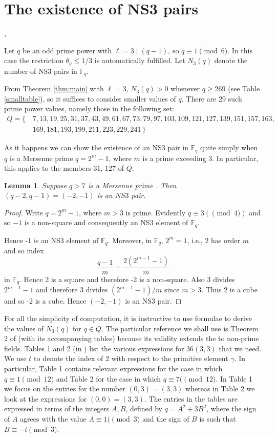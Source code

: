 \documentclass[12pt]{amsart}
\newtheorem{lemma}[thm]{Lemma}
\numberwithin{equation}{section}
\newcommand{\F}{\mathbb{F}_q}
\begin{document}
   
   
 
  \section{The existence of NS3 pairs} 
, 

Let $q$ be an odd prime power with $\ell=3\mid(q-1)$, so $q \equiv 1 \pmod{6}$.  In this case
the restriction $\theta_q\le1/3$ is automatically fulfilled.  Let $N_3(q)$ denote the
number of NS3 pairs in $\F$. 

From Theorem \ref{thm:main} with $\ell=3$,  $N_3(q) >0$ whenever $q\ge 269$ (see Table \ref{smalltable}), so it suffices to consider smaller values of $q$.
There are 29 such prime power values, namely those in the following set:
\begin{align*}
Q=\{\, & 7, 13, 19, 25,  31, 37,43,49, 61, 67,73, 79, 97, 103,  109, 121, 127, 139, 151, 157, 163,\\ & 169,181,  193,199, 211, 223,  229, 241 \,\}\,
\end{align*} 
 
 As it happens we can  show the existence of an NS3 pair in $\F$ quite simply   when $q$ is a Mersenne prime $q=2^m-1$, where $m$ is a prime exceeding 3.
 In particular,  this applies to the members 31, 127 of $Q$. 
\begin{lemma} \label{mers}
Suppose $q>7$ is a Mersenne prime .  Then $(q-2,q-1)=(-2,-1)$ is an $NS3$ pair.
\end{lemma} 
\begin{proof}
Write $q=2^m-1$, where $m >3$ is prime.  Evidently $q \equiv 3 (\pmod {4})$  and so $-1$ is a non-square and consequently an NS3  element of $\F$. 

Hence -1 is an NS3 element of $\F$. Moreover, in $\F$, $2^m=1$, i.e., 2 has order $m$ and so index
\[
 \frac{q-1}{m}= \frac{2(2^{m-1}-1)}{m}
\]
 in $\F$.   Hence 2 is a square and therefore -2 is a non-square.     Also 3 divides $2^{m-1}-1$ and therefore 3 divides $(2^{m-1}-1)/m$ since $m>3$.
 Thus 2  is a cube and so -2 is a cube.  Hence $(-2,-1)$ is an NS3 pair.
\end{proof}
\bigskip
For all the simplicity of computation, it is instructive to use formulae to derive the values of $N_3(q)$ for $q \in Q$.  The particular reference we shall use is Theorem 2 of \cite{AK1995} (with its accompanying tables)  because its validity  extends the to non-prime fields. Tables  1 and 2 (in \cite{AK1995}) list the various expressions for $36(3,3)$ that we need.  We use $t$ to denote the index of  $2$ with respect to the primitive element $\gamma$.   In particular,  Table 1 contains relevant expressions for the case in which $q \equiv 1 \pmod {12}$ and Table 2 for the case in which   $q \equiv 7 (\pmod{12}$.  In Table 1 we focus on the entries for the number $(0,3) =(3,3)$ whereas in Table 2 we look at the expressions for $(0,0)=(3,3)$.  The entries in the tables are expressed in terms of the integers $A,B$, defined by $q=A^2+3B^2$, where the sign of $A$ agrees with the value $A\equiv 1 (\pmod{3}$ and the sign of $B$ is such that $B \equiv -t  \pmod{3}$. 
\end{document}
